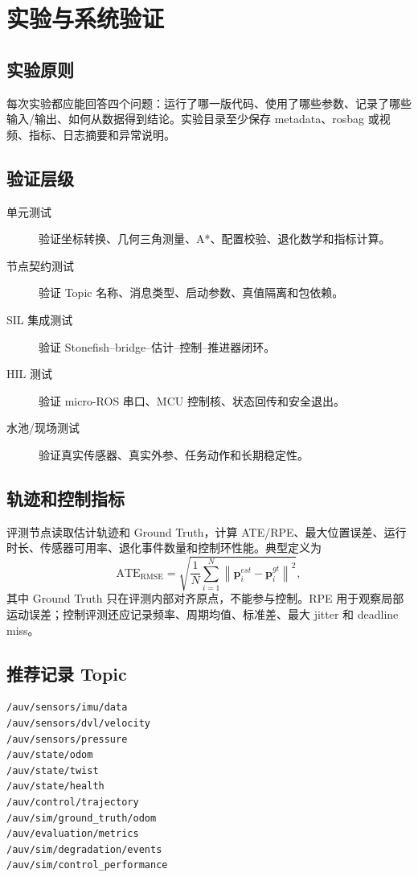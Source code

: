 \chapter{实验与系统验证}
\label{ch:experiments}

\section{实验原则}
每次实验都应能回答四个问题：运行了哪一版代码、使用了哪些参数、记录了哪些输入/输出、如何从数据得到结论。实验目录至少保存 metadata、rosbag 或视频、指标、日志摘要和异常说明。

\section{验证层级}
\begin{description}
  \item[单元测试] 验证坐标转换、几何三角测量、A*、配置校验、退化数学和指标计算。
  \item[节点契约测试] 验证 Topic 名称、消息类型、启动参数、真值隔离和包依赖。
  \item[SIL 集成测试] 验证 Stonefish--bridge--估计--控制--推进器闭环。
  \item[HIL 测试] 验证 micro-ROS 串口、MCU 控制核、状态回传和安全退出。
  \item[水池/现场测试] 验证真实传感器、真实外参、任务动作和长期稳定性。
\end{description}

\section{轨迹和控制指标}
评测节点读取估计轨迹和 Ground Truth，计算 ATE/RPE、最大位置误差、运行时长、传感器可用率、退化事件数量和控制环性能。典型定义为
\begin{equation}
  \mathrm{ATE}_{\mathrm{RMSE}}
  = \sqrt{\frac{1}{N}\sum_{i=1}^{N}
  \left\|\mathbf{p}^{est}_i-\mathbf{p}^{gt}_i\right\|^2},
\end{equation}
其中 Ground Truth 只在评测内部对齐原点，不能参与控制。RPE 用于观察局部运动误差；控制评测还应记录频率、周期均值、标准差、最大 jitter 和 deadline miss。

\section{推荐记录 Topic}
\begin{lstlisting}[caption={基线实验的最小 rosbag 主题集合}]
/auv/sensors/imu/data
/auv/sensors/dvl/velocity
/auv/sensors/pressure
/auv/state/odom
/auv/state/twist
/auv/state/health
/auv/control/trajectory
/auv/sim/ground_truth/odom
/auv/evaluation/metrics
/auv/sim/degradation/events
/auv/sim/control_performance
\end{lstlisting}

